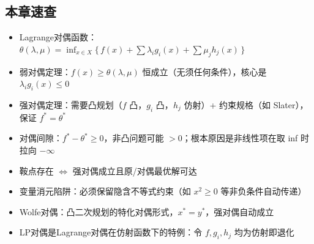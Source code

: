 \subsection{本章速查}

\begin{itemize}
  \item Lagrange对偶函数：$\theta(\lambda,\mu) = \inf_{x\in X} \{\,f(x) + \sum\lambda_i g_i(x) + \sum\mu_j h_j(x)\,\}$
  \item 弱对偶定理：$f(x) \ge \theta(\lambda,\mu)$ 恒成立（无须任何条件），核心是 $\lambda_i g_i(x) \le 0$
  \item 强对偶定理：需要凸规划（$f$ 凸，$g_i$ 凸，$h_j$ 仿射）+ 约束规格（如 Slater），保证 $f^* = \theta^*$
  \item 对偶间隙：$f^* - \theta^* \ge 0$，非凸问题可能 $>0$；根本原因是非线性项在取 inf 时拉向 $-\infty$
  \item 鞍点存在 $\Longleftrightarrow$ 强对偶成立且原/对偶最优解可达
  \item 变量消元陷阱：必须保留隐含不等式约束（如 $x^2 \ge 0$ 等非负条件自动传递）
  \item Wolfe对偶：凸二次规划的特化对偶形式，$x^* = y^*$，强对偶自动成立
  \item LP对偶是Lagrange对偶在仿射函数下的特例：令 $f,g_i,h_j$ 均为仿射即退化
\end{itemize}
